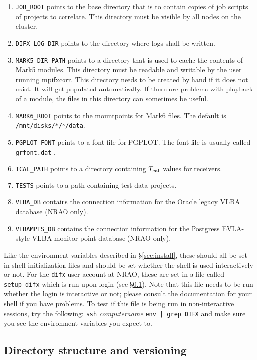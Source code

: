 \begin{enumerate}
\item {\tt JOB\_ROOT} points to the base directory that is to contain copies of job scripts of projects to correlate.
This directory must be visible by all nodes on the cluster.
\item {\tt DIFX\_LOG\_DIR} points to the directory where logs shall be written.
\item {\tt MARK5\_DIR\_PATH} points to a directory that is used to cache the contents of Mark5 modules.
This directory must be readable and writable by the user running mpifxcorr.
This directory needs to be created by hand if it does not exist.  
It will get populated automatically.
If there are problems with playback of a module, the files in this directory can sometimes be useful.
\item {\tt MARK6\_ROOT} points to the mountpoints for Mark6 files.
The default is {\tt /mnt/disks/*/*/data}.
\item {\tt PGPLOT\_FONT} points to a font file for PGPLOT.
The font file is usually called {\tt grfont.dat} .
\item {\tt TCAL\_PATH} points to a directory containing $T_{\rm cal}$ values for receivers.
\item {\tt TESTS} points to a path containing test data projects.
\item {\tt VLBA\_DB} contains the connection information for the Oracle legacy VLBA database (NRAO only).
\item {\tt VLBAMPTS\_DB} contains the connection information for the Postgress EVLA-style VLBA monitor point database (NRAO only).
\end{enumerate}
Like the environment variables described in \S\ref{sec:install}, these should all be set in shell initialization files and should be set whether the shell is used interactively or not.
For the {\tt difx} user account at NRAO, these are set in a file called {\tt setup\_difx} which is run upon login (see \S\ref{sec:versions}).
Note that this file needs to be run whether the login is interactive or not; please consult the documentation for your shell if you have problems.
To test if this file is being run in non-interactive sessions, try the following: {\tt ssh} {\em computername} {\tt env | grep DIFX} and make sure you see the environment variables you expect to.


\subsection{Directory structure and versioning} \label{sec:versions}

